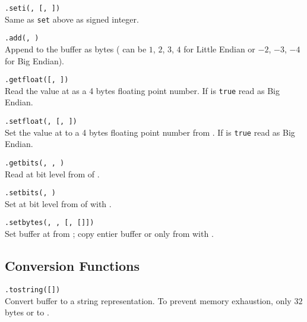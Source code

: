 \hangpar {}\texttt{.seti(}\texttt{, }\texttt{[, }\texttt{])} \\
Same as \texttt{set} above as signed integer.

\hangpar {}\texttt{.add(}\texttt{, }\texttt{)} \\
Append  to the  buffer as  bytes ( can be $1$, $2$, $3$, $4$ for Little Endian or $-2$, $-3$, $-4$ for Big Endian).

\hangpar {}\texttt{.getfloat(}\texttt{[, }\texttt{])} \\
Read the value at  as a 4 bytes floating point number. If  is \texttt{true} read as Big Endian.

\hangpar {}\texttt{.setfloat(}\texttt{, }\texttt{[, }\texttt{])} \\
Set the value at  to a 4 bytes floating point number from . If  is \texttt{true} read as Big Endian.

\hangpar {}\texttt{.getbits(}\texttt{, }\texttt{, }\texttt{)} \\
Read at bit level from  of .

\hangpar {}\texttt{.setbits(}\texttt{, }\texttt{)} \\
Set at bit level from  of  with .

\hangpar {}\texttt{.setbytes(}\texttt{, }\texttt{, [}\texttt{, [}\texttt{]])}\\
Set buffer at  from ; copy entier buffer or only from  with .

\subsection*{Conversion Functions}

\hangpar {}\texttt{.tostring([}\texttt{])}\\
Convert  buffer to a string representation. To prevent memory exhaustion, only $32$ bytes or to .

